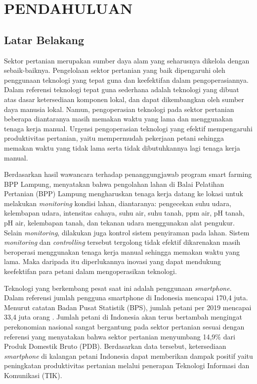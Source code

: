 \chapter{PENDAHULUAN}

\vspace{4.5pt}

\begin{flushleft}
  \begin{justify}
    \section{Latar Belakang} 
    Sektor pertanian merupakan sumber daya alam yang seharusnya dikelola dengan sebaik-baiknya. 
    Pengelolaan sektor pertanian yang baik dipengaruhi oleh penggunaan teknologi yang tepat guna dan keefektifan dalam pengoperasiannya. 
    Dalam referensi \cite{dokumenBalitbang} teknologi tepat guna sederhana adalah teknologi yang dibuat atas dasar ketersediaan komponen lokal, 
    dan dapat dikembangkan oleh sumber daya manusia lokal. Namun, pengoperasian teknologi pada sektor pertanian beberapa diantaranya masih 
    memakan waktu yang lama dan menggunakan tenaga kerja manual. Urgensi pengoperasian teknologi yang efektif mempengaruhi produktivitas 
    pertanian, yaitu mempermudah pekerjaan petani sehingga memakan waktu yang tidak lama serta tidak dibutuhkannya lagi tenaga kerja manual. 

    Berdasarkan hasil wawancara terhadap penanggungjawab program smart farming BPP Lampung, menyatakan bahwa pengolahan lahan di 
    Balai Pelatihan Pertanian (BPP) Lampung mengharuskan tenaga kerja datang ke lokasi untuk melakukan \textit{monitoring} 
    kondisi lahan, diantaranya: pengecekan suhu udara, kelembapan udara, intensitas cahaya, suhu air, suhu tanah, ppm air, 
    pH tanah, pH air, kelembapan tanah, dan tekanan udara menggunakan alat pengukur. Selain \textit{monitoring}, dilakukan juga 
    kontrol sistem penyiraman pada lahan. Sistem \textit{monitoring} dan \textit{controlling} tersebut tergolong tidak efektif 
    dikarenakan masih beroperasi menggunakan tenaga kerja manual sehingga memakan waktu yang lama. Maka daripada itu diperlukannya  
    inovasi yang dapat mendukung keefektifan para petani dalam mengoperasikan teknologi. 

    Teknologi yang berkembang pesat saat ini adalah penggunaan \textit{smartphone}. Dalam referensi \cite{web-datasmartphone} 
    jumlah pengguna smartphone di Indonesia mencapai 170,4 juta. Menurut catatan Badan Pusat Statistik (BPS), jumlah petani per 2019 mencapai 33,4 juta orang \cite{databps}. 
    Jumlah petani di Indonesia akan terus bertambah mengingat perekonomian nasional sangat bergantung pada sektor pertanian sesuai dengan 
    referensi \cite{jurnal-kajianAplikasi} yang menyatakan bahwa sektor pertanian menyumbang 14,9\% dari Produk Domestik Bruto (PDB). Berdasarkan data tersebut, ketersediaan \textit{smartphone} di kalangan petani Indonesia dapat memberikan dampak positif yaitu peningkatan produktivitas pertanian melalui penerapan Teknologi Informasi dan  Komunikasi (TIK). 


\end{justify}
\end{flushleft}
